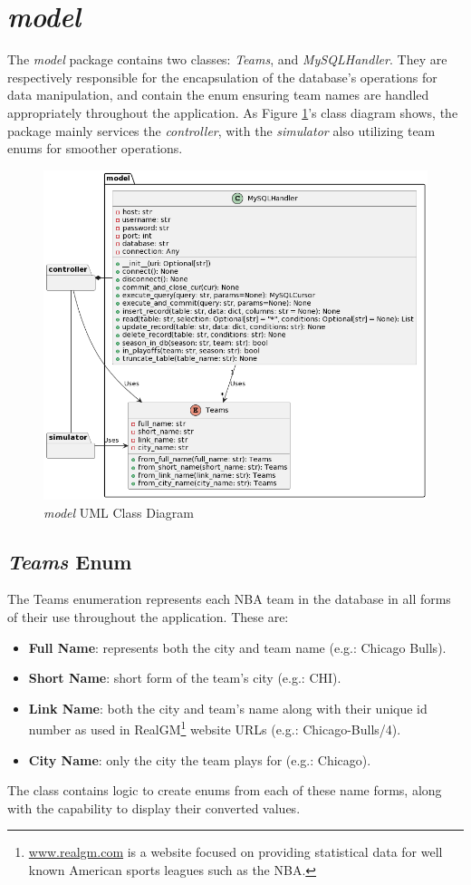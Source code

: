 \documentclass{thesis-ekf}
\theoremstyle{definition}
\theoremstyle{remark}
\begin{document}
\section{\emph{model}}
The \emph{model} package contains two classes: \emph{Teams}, and \emph{MySQLHandler}. They are respectively responsible for the encapsulation of the database's operations for data manipulation, and contain the enum ensuring team names are handled appropriately throughout the application. As Figure \ref{img-model-class}'s class diagram shows, the package mainly services the \emph{controller}, with the \emph{simulator} also utilizing team enums for smoother operations.
\begin{figure}[th!]
	\centering
	\includegraphics[width=0.8\linewidth]{img/class/model}
	\caption{\emph{model} UML Class Diagram}
	\label{img-model-class}
\end{figure}

\subsection{\emph{Teams} Enum}
The Teams enumeration represents each NBA team in the database in all forms of their use throughout the application. These are:
\begin{itemize}
	\item \textbf{Full Name}: represents both the city and team name (e.g.: Chicago Bulls).
	\item \textbf{Short Name}: short form of the team's city (e.g.: CHI).
	\item \textbf{Link Name}: both the city and team's name along with their unique id number as used in RealGM\footnote{\url{www.realgm.com} is a website focused on providing statistical data for well known American sports leagues such as the NBA.} website URLs (e.g.: Chicago-Bulls/4).
	\item \textbf{City Name}: only the city the team plays for (e.g.: Chicago).
\end{itemize} 
The class contains logic to create enums from each of these name forms, along with the capability to display their converted values.
\end{document}
